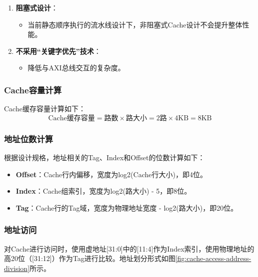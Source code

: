 \begin{enumerate}
  \begin{itemize}
  \tightlist
  \item
    数据Cache写回写分配策略简化写操作Cache Miss处理流程，与读操作Cache Miss处理流程一致。
  \end{itemize}
\item
  \textbf{阻塞式设计}：

  \begin{itemize}
  \tightlist
  \item
    当前静态顺序执行的流水线设计下，非阻塞式Cache设计不会提升整体性能。
  \end{itemize}
\item
  \textbf{不采用``关键字优先''技术}：

  \begin{itemize}
  \tightlist
  \item
    降低与AXI总线交互的复杂度。
  \end{itemize}
\end{enumerate}

\subsubsection{Cache容量计算}\label{sec:09-cache-005}

Cache缓存容量计算如下：
\[
\text{Cache缓存容量} = \text{路数} \times \text{路大小} = 2 \text{路} \times 4 \text{KB} = 8 \text{KB}
\]

\subsubsection{地址位数计算}\label{sec:09-cache-006}

根据设计规格，地址相关的Tag、Index和Offset的位数计算如下：

\begin{itemize}
\tightlist
\item
  \textbf{Offset}：Cache行内偏移，宽度为log2(Cache行大小)，即4位。
\item
  \textbf{Index}：Cache组索引，宽度为log2(路大小) - 5，即8位。
\item
  \textbf{Tag}：Cache行的Tag域，宽度为物理地址宽度 - log2(路大小)，即20位。
\end{itemize}

\subsubsection{地址访问}\label{sec:09-cache-007}

对Cache进行访问时，使用虚地址{[}31:0{]}中的{[}11:4{]}作为Index索引，使用物理地址的高20位（{[}31:12{]}）作为Tag进行比较。地址划分形式如图\ref{fig:cache-access-address-division}所示。

